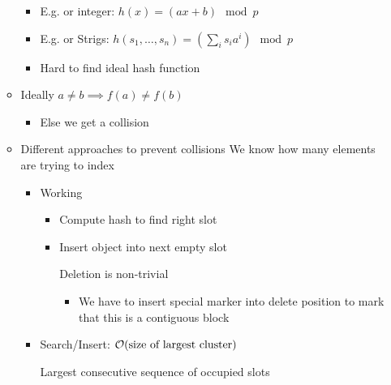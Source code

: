 \begin{itemize}
\begin{itemize}
\begin{itemize}
                    \item E.g. or integer: $h(x) = (ax + b) \mod p$
                    \item E.g. or Strigs: $h(s_1, \dots, s_n) = (\sum_{i} s_ia^i) \mod p$
                    \item Hard to find ideal hash function
                \end{itemize}
            \item Ideally $a \neq b \implies f(a) \neq f(b)$
                \begin{itemize}
                    \item Else we get a collision
                \end{itemize}
            \item Different approaches to prevent collisions
             We know how many elements are trying to index
                \begin{itemize}
                        \begin{itemize}
                            \item Working
                                \begin{itemize}
                                    \item Compute hash to find right slot
                                    \item Insert object into next empty slot
                                        \begin{itemize}
                                            \icon Deletion is non-trivial
                                                \begin{itemize}
                                                    \item We have to insert special marker into delete position to mark that this is a contiguous block
                                                \end{itemize}
                                        \end{itemize}
                                \end{itemize}
                            \item Search/Insert: $\mathcal{O}(\text{size of largest cluster})$
                                \begin{itemize}
                                     Largest consecutive sequence of occupied slots
                                \end{itemize}

\end{itemize}
\end{itemize}
\end{itemize}
\end{itemize}

